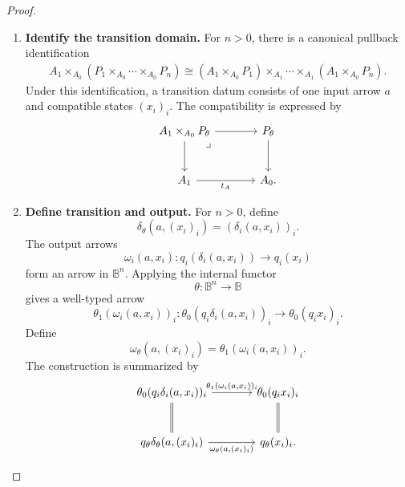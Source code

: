 \begin{proof}
\begin{enumerate}
        \item \textbf{Identify the transition domain.}
        For \(n>0\), there is a canonical pullback identification
        \[
        \begin{aligned}
            A_1\times_{A_0}
            \left(P_1\times_{A_0}\cdots\times_{A_0}P_n\right)
            \cong
            \left(A_1\times_{A_0}P_1\right)
            \times_{A_1}
            \cdots
            \times_{A_1}
            \left(A_1\times_{A_0}P_n\right).
        \end{aligned}
        \]
        Under this identification, a transition datum consists of one input
        arrow \(a\) and compatible states \((x_i)_i\). The compatibility is
        expressed by
        \[
        \begin{tikzcd}[column sep=large, row sep=large]
            A_1\times_{A_0}P_\theta
                \arrow[r]
                \arrow[d]
                \arrow[dr, phantom, "\lrcorner", very near start]
            &
            P_\theta
                \arrow[d]
            \\
            A_1
                \arrow[r, "t_A"']
            &
            A_0 .
        \end{tikzcd}
        \]

        \item \textbf{Define transition and output.}
        For \(n>0\), define
        \[
            \delta_\theta(a,(x_i)_i)
            =
            (\delta_i(a,x_i))_i.
        \]
        The output arrows
        \[
            \omega_i(a,x_i):
            q_i(\delta_i(a,x_i))\to q_i(x_i)
        \]
        form an arrow in \(\mathbb B^n\). Applying the internal functor
        \[
            \theta:\mathbb B^n\to\mathbb B
        \]
        gives a well-typed arrow
        \[
            \theta_1(\omega_i(a,x_i))_i:
            \theta_0(q_i\delta_i(a,x_i))_i
            \to
            \theta_0(q_ix_i)_i.
        \]
        Define
        \[
            \omega_\theta(a,(x_i)_i)
            =
            \theta_1(\omega_i(a,x_i))_i.
        \]
        The construction is summarized by
        \[
        \begin{tikzcd}[column sep=large, row sep=large]
            \theta_0(q_i\delta_i(a,x_i))_i
                \arrow[r, "{\theta_1(\omega_i(a,x_i))_i}"]
                \arrow[d, equal]
            &
            \theta_0(q_ix_i)_i
                \arrow[d, equal]
            \\
            q_\theta\delta_\theta(a,(x_i)_i)
                \arrow[r, "{\omega_\theta(a,(x_i)_i)}"']
            &
            q_\theta(x_i)_i .
        \end{tikzcd}
        \]


\end{enumerate}
\end{proof}

